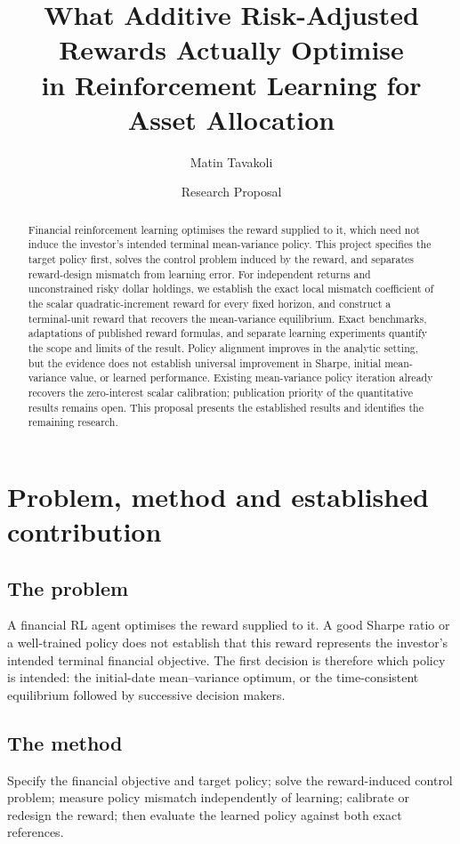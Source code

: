 \documentclass[11pt,a4paper]{article}
\title{\vspace{-1.5em}What Additive Risk-Adjusted Rewards Actually Optimise\\
in Reinforcement Learning for Asset Allocation}
\author{Matin Tavakoli}
\date{Research Proposal}
\theoremstyle{plain}
\theoremstyle{definition}
\begin{document}
\maketitle
\vspace{-1.5em}


\begin{abstract}

\noindent Financial reinforcement learning optimises the reward supplied to it, which need not induce the investor's intended terminal mean-variance policy. This project specifies the target policy first, solves the control problem induced by the reward, and separates reward-design mismatch from learning error. For independent returns and unconstrained risky dollar holdings, we establish the exact local mismatch coefficient of the scalar quadratic-increment reward for every fixed horizon, and construct a terminal-unit reward that recovers the mean-variance equilibrium. Exact benchmarks, adaptations of published reward formulas, and separate learning experiments quantify the scope and limits of the result. Policy alignment improves in the analytic setting, but the evidence does not establish universal improvement in Sharpe, initial mean-variance value, or learned performance. Existing mean-variance policy iteration already recovers the zero-interest scalar calibration; publication priority of the quantitative results remains open. This proposal presents the established results and identifies the remaining research.

\end{abstract}

\section{Problem, method and established contribution}

\subsection{The problem}
A financial RL agent optimises the reward supplied to it. A good Sharpe ratio or a well-trained policy does not establish that this reward represents the investor's intended terminal financial objective. The first decision is therefore which policy is intended: the initial-date mean--variance optimum, or the time-consistent equilibrium followed by successive decision makers.

\subsection{The method}
Specify the financial objective and target policy; solve the reward-induced control problem; measure policy mismatch independently of learning; calibrate or redesign the reward; then evaluate the learned policy against both exact references.
\end{document}
